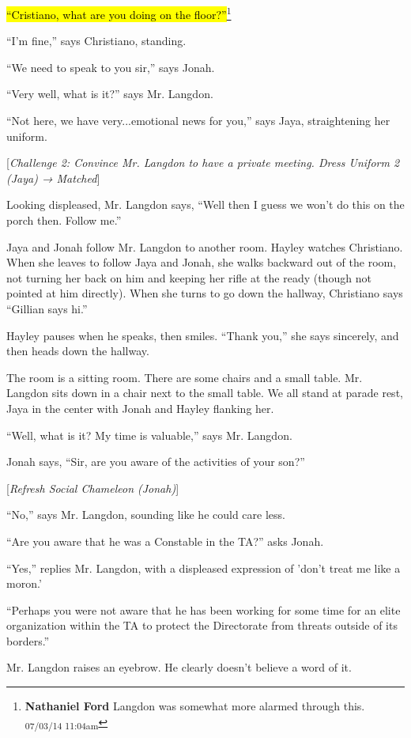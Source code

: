 \hl{``Cristiano, what are you doing on the floor?''}\footnote{\textbf{Nathaniel Ford }Langdon was somewhat more alarmed through this. \textsubscript{07/03/14 11:04am}}

``I'm fine,'' says Christiano, standing.

``We need to speak to you sir,'' says Jonah.

``Very well, what is it?'' says Mr. Langdon.

``Not here, we have very...emotional news for you,'' says Jaya, straightening her uniform.

{[}\textit{Challenge 2: Convince Mr. Langdon to have a private meeting. Dress Uniform 2 (Jaya) → Matched}{]} 

Looking displeased, Mr. Langdon says, ``Well then I guess we won't do this on the porch then.  Follow me.''

Jaya and Jonah follow Mr. Langdon to another room.  Hayley watches Christiano.  When she leaves to follow Jaya and Jonah, she walks backward out of the room, not turning her back on him and keeping her rifle at the ready (though not pointed at him directly).  When she turns to go down the hallway, Christiano says ``Gillian says hi.''

Hayley pauses when he speaks, then smiles.  ``Thank you,'' she says sincerely, and then heads down the hallway.



The room is a sitting room.  There are some chairs and a small table.  Mr. Langdon sits down in a chair next to the small table.  We all stand at parade rest, Jaya in the center with Jonah and Hayley flanking her.

``Well, what is it?  My time is valuable,'' says Mr. Langdon.

Jonah says,  ``Sir, are you aware of the activities of your son?''

{[}\textit{Refresh Social Chameleon (Jonah)}{]}

``No,'' says Mr. Langdon, sounding like he could care less.

``Are you aware that he was a Constable in the TA?'' asks Jonah.

``Yes,'' replies Mr. Langdon, with a displeased expression of 'don't treat me like a moron.'

``Perhaps you were not aware that he has been working for some time for an elite organization within the TA to protect the Directorate from threats outside of its borders.''

Mr. Langdon raises an eyebrow.  He clearly doesn't believe a word of it.

